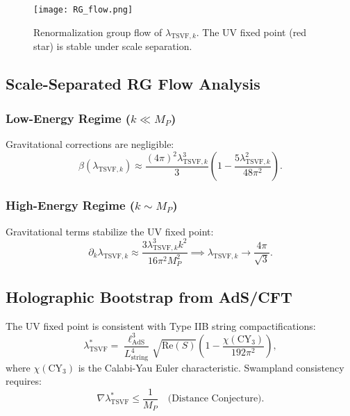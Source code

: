 \documentclass[twocolumn,superscriptaddress,floatfix]{revtex4-2}
\begin{document}
\begin{figure}[ht]
    \centering
    \texttt{[image: RG\_flow.png]}
    \caption{Renormalization group flow of \(\lambda_{\text{TSVF},k}\). The UV fixed point (red star) is stable under scale separation.}
    \label{fig:rg_flow}
\end{figure}

\subsection{Scale-Separated RG Flow Analysis}
\subsubsection{\texorpdfstring{Low-Energy Regime ($k \ll M_P$)}{Low-Energy Regime (k << M\_P)}}
\label{subsubsec:low_energy}
Gravitational corrections are negligible:
\begin{equation}
    \beta(\lambda_{\text{TSVF},k}) \approx \frac{(4\pi)^2 \lambda_{\text{TSVF},k}^3}{3} \left( 1 - \frac{5\lambda_{\text{TSVF},k}^2}{48\pi^2} \right).
    \label{eq:beta_low}
\end{equation}


\subsubsection{\texorpdfstring{High-Energy Regime ($k \sim M_P$)}{High-Energy Regime (k ~ M\_P)}}
\label{subsubsec:high_energy}
Gravitational terms stabilize the UV fixed point:
\begin{equation}
    \partial_k \lambda_{\text{TSVF},k} \approx \frac{3\lambda_{\text{TSVF},k}^3 k^2}{16\pi^2 M_P^2} \implies \lambda_{\text{TSVF},k} \to \frac{4\pi}{\sqrt{3}}.
    \label{eq:beta_high}
\end{equation}

\subsection{Holographic Bootstrap from AdS/CFT}
The UV fixed point is consistent with Type IIB string compactifications:
\begin{equation}
    \lambda_{\text{TSVF}}^* = \frac{\ell_{\text{AdS}}^3}{L_{\text{string}}^4} \sqrt{\text{Re}(S)} \left( 1 - \frac{\chi(\text{CY}_3)}{192\pi^2} \right),
    \label{eq:holographic}
\end{equation}
where \(\chi(\text{CY}_3)\) is the Calabi-Yau Euler characteristic. Swampland consistency requires:
\begin{equation}
    \nabla \lambda_{\text{TSVF}}^* \leq \frac{1}{M_P} \quad \text{(Distance Conjecture)}.
    \label{eq:swampland}
\end{equation}
\end{document}
